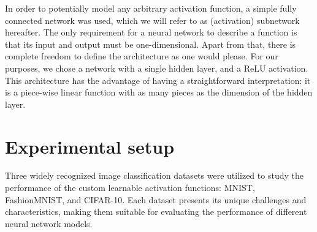 In order to potentially model any arbitrary activation function, a simple fully connected network was used, which we will refer to as (activation) subnetwork hereafter. The only requirement for a neural network to describe a function is that its input and output must be one-dimensional. Apart from that, there is complete freedom to define the architecture as one would please. For our purposes, we chose a network with a single hidden layer, and a ReLU activation. This architecture has the advantage of having a straightforward interpretation: it is a piece-wise linear function with as many pieces as the dimension of the hidden layer.




\section{Experimental setup}


Three widely recognized image classification datasets were utilized to study the performance of the custom learnable activation functions: MNIST, FashionMNIST, and CIFAR-10. Each dataset presents its unique challenges and characteristics, making them suitable for evaluating the performance of different neural network models.


